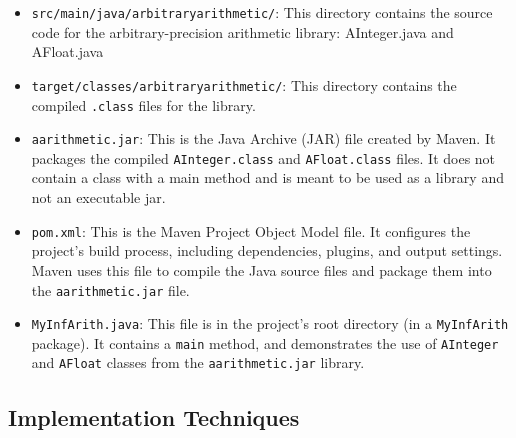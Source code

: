 \documentclass[a4paper,12pt]{article}
\begin{document}
\begin{itemize}
    \item \texttt{src/main/java/arbitraryarithmetic/}: This directory contains the source code for the arbitrary-precision arithmetic library: AInteger.java and AFloat.java
    \item \texttt{target/classes/arbitraryarithmetic/}: This directory contains the compiled \texttt{.class} files for the library.
    \item \texttt{aarithmetic.jar}: This is the Java Archive (JAR) file created by Maven. It packages the compiled \texttt{AInteger.class} and \texttt{AFloat.class} files. It does not contain a class with a main method and is meant to be used as a library and not an executable jar.
    \item \texttt{pom.xml}: This is the Maven Project Object Model file. It configures the project's build process, including dependencies, plugins, and output settings. Maven uses this file to compile the Java source files and package them into the \texttt{aarithmetic.jar} file.
    \item \texttt{MyInfArith.java}: This file is in the project's root directory (in a \texttt{MyInfArith} package). It contains a \texttt{main} method, and demonstrates the use of \texttt{AInteger} and \texttt{AFloat} classes from the \texttt{aarithmetic.jar} library.
\end{itemize}

\subsection{Implementation Techniques}
\end{document}
